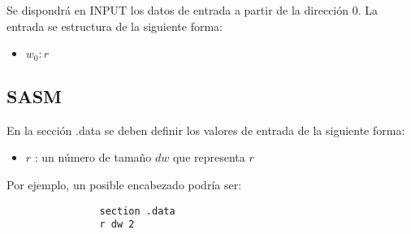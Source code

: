 \documentclass[a4paper]{article}
\begin{document}
\begin{flushleft}
      	     Se dispondrá en INPUT los datos de entrada a partir de la dirección 0. La entrada se estructura de la siguiente forma:
      	     
      	     \begin{itemize}
      	     	
      	     	\item $w_{0}: r$
      	     \end{itemize}
      	     
      	     \subsection*{SASM}
      	     
      	     En la sección .data se deben definir los valores de entrada de la siguiente forma:
      	     
      	     \begin{itemize}
      	     	
      	     	\item $r$ : un número de tamaño $dw$ que representa $r$
      	     	
      	     \end{itemize}
      	     
      	     Por ejemplo, un posible encabezado podría ser:
      	     
      	     \begin{lstlisting}
      	     	section .data
      	     	r dw 2
      	     \end{lstlisting}
      			
	 \end{flushleft}
	 
	 
\end{document}
